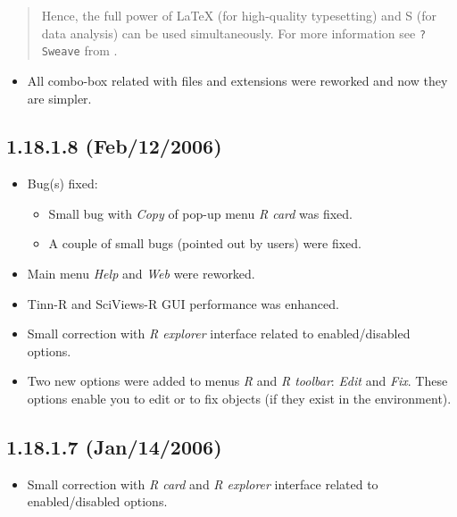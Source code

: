 \begin{footnotesize}
  \begin{quotation}
    Hence, the full power of LaTeX (for high-quality typesetting) and S (for data
    analysis) can be used simultaneously. For more information see \texttt{?Sweave}
    from \RR{}.
  \end{quotation}
\end{footnotesize}

\begin{itemize}
  \item All combo-box related with files and extensions were reworked
    and now they are simpler.
\end{itemize}


\subsection*{1.18.1.8 (Feb/12/2006)}
\begin{itemize}
  \item Bug(s) fixed:
    \begin{itemize}
      \item Small bug with \textit{Copy} of pop-up menu \textit{R card}
        was fixed.
      \item A couple of small bugs (pointed out by users) were fixed.
    \end{itemize}
  \item Main menu \textit{Help} and \textit{Web} were reworked.
  \item Tinn-R and SciViews-R GUI performance was enhanced.
  \item Small correction with \textit{R explorer} interface
    related to enabled/disabled options.
  \item Two new options were added to menus \textit{R} and \textit{R toolbar}:
    \textit{Edit} and \textit{Fix}. These options enable
    you to edit or to fix \RR{} objects (if they exist in the \RR{}
    environment).
\end{itemize}


\subsection*{1.18.1.7 (Jan/14/2006)}
\begin{itemize}
  \item Small correction with \textit{R card} and \textit{R explorer}
    interface related to enabled/disabled options.
\end{itemize}


